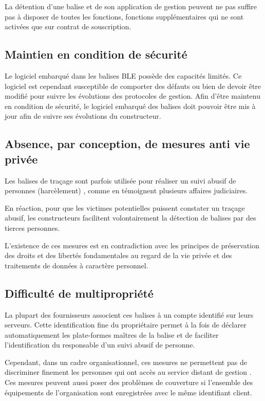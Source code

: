 \documentclass[headings=small,cmyk,french,a4paper,twocolumn,garamond,11pt]{scrartcl}
\begin{document}
La détention d'une balise et de son application de gestion peuvent ne
pas suffire pas à disposer de toutes les fonctions, fonctions
supplémentaires qui ne sont activées que sur contrat de souscription.



\subsection{Maintien en condition de sécurité}
Le logiciel embarqué dans les balises \acrshort{BLE} possède des capacités
limités. Ce logiciel est cependant susceptible de comporter des
défauts ou bien de devoir être modifié pour suivre les évolutions des
protocoles de gestion. Afin d'être maintenu en condition de
sécurité, le logiciel embarqué des balises doit pouvoir être mis à
jour afin de suivre ses évolutions du constructeur.

\subsection{Absence, par conception, de mesures anti vie privée }
Les balises de traçage sont parfois utilisée pour réaliser un suivi
abusif de personnes (harcèlement) , comme en témoignent plusieurs affaires
judiciaires.

En réaction, pour que les victimes potentielles puissent constater un
traçage abusif, les constructeurs facilitent volontairement la
détection de balises par des tierces personnes.

L'existence de ces mesures est en contradiction avec les principes de
préservation des droits et des libertés fondamentales au regard de la
vie privée et des traitements de données à caractère personnel.

\subsection{Difficulté de multipropriété}
La plupart des fournisseurs associent ces balises à un compte
identifié sur leurs serveurs. Cette identification fine du
propriétaire permet à la fois de déclarer automatiquement les
plate-formes maîtres de la balise et de faciliter l'identification du
responsable d'un suivi abusif de personne.

Cependant, dans un cadre organisationnel, ces mesures ne permettent pas
de discriminer finement les personnes qui ont accès au service distant
de gestion . Ces mesures peuvent aussi poser des problèmes de
couverture si l'ensemble des  équipements de l'organisation sont
enregistrées avec le même identifiant client.
\end{document}
